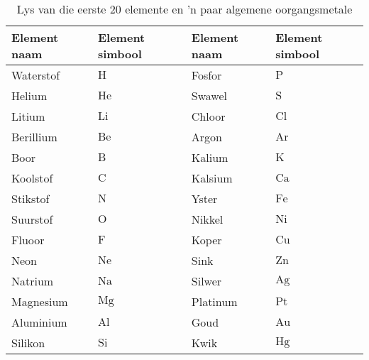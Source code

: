 \begin{table}[H]
\label{tab:elements}
\begin{center}
\begin{tabular}{|l|l|l|l|}\hline
\textbf{Element naam} & \textbf{Element simbool} & \textbf{Element naam} & \textbf{Element simbool} \\ \hline
Waterstof & $\text{H}$ & Fosfor & $\text{P}$  \\ \hline
Helium & $\text{He}$ & Swawel & $\text{S}$ \\ \hline
Litium & $\text{Li}$ & Chloor & $\text{Cl}$ \\ \hline
Berillium & $\text{Be}$ & Argon & $\text{Ar}$ \\ \hline 
Boor & $\text{B}$ & Kalium & $\text{K}$ \\ \hline
Koolstof & $\text{C}$ & Kalsium & $\text{Ca}$ \\ \hline 
Stikstof & $\text{N}$ & Yster & $\text{Fe}$ \\ \hline
Suurstof & $\text{O}$ & Nikkel & $\text{Ni}$ \\ \hline 
Fluoor & $\text{F}$ & Koper & $\text{Cu}$ \\ \hline
Neon & $\text{Ne}$  & Sink & $\text{Zn}$ \\ \hline
Natrium & $\text{Na}$  & Silwer & $\text{Ag}$ \\ \hline
Magnesium & $\text{Mg}$  & Platinum & $\text{Pt}$ \\ \hline
Aluminium & $\text{Al}$ & Goud & $\text{Au}$ \\ \hline
Silikon & $\text{Si}$ & Kwik & $\text{Hg}$  \\ \hline
\end{tabular}
\end{center}
\caption{Lys van die eerste 20 elemente en 'n paar algemene oorgangsmetale}
\end{table}
\par 


      \label{m38708*uid26}
